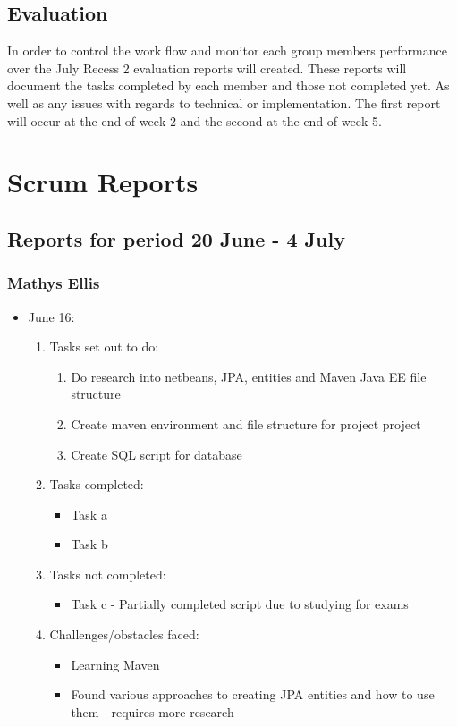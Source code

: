 \documentclass[12pt]{article}
\begin{document}
\subsection{Evaluation}
In order to control the work flow and monitor each group members performance over the July Recess 2 evaluation reports will created. These reports will document the tasks completed by each member and those not completed yet. As well as any issues with regards to technical or implementation. The first report will occur at the end of week 2 and the second at the end of week 5.  

\newpage
\section{Scrum Reports}
\subsection{Reports for period 20 June - 4 July}
\subsubsection{Mathys Ellis}
	\begin{itemize}
		\item June 16:
		\begin{enumerate}
			\item Tasks set out to do:
			\begin{enumerate}
				\item Do research into netbeans, JPA, entities and Maven Java EE file structure
				\item Create maven environment and file structure for project project
				\item Create SQL script for database
			\end{enumerate}
			\item Tasks completed:
			\begin{itemize}
				\item Task a
				\item Task b
			\end{itemize}
			\item Tasks not completed:
			\begin{itemize}
				\item Task c - Partially completed script due to studying for exams
			\end{itemize}
			\item Challenges/obstacles faced:
			\begin{itemize}
				\item Learning Maven
				\item Found various approaches to creating JPA entities and how to use them - requires more research
			\end{itemize}			
		\end{enumerate}
	\end{itemize}
	
\end{document}
